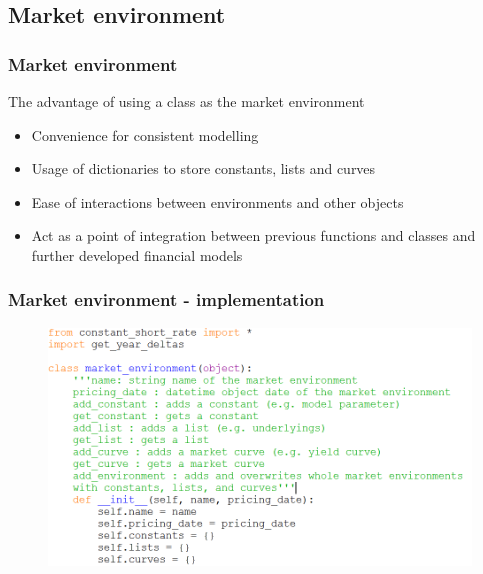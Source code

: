 \documentclass{beamer}
\begin{document}
\subsection{Market environment}
\begin{frame}
\frametitle{Market environment}
The advantage of using a class as the market environment\\[2mm]
\begin{itemize}
	\item Convenience for consistent modelling
	\item Usage of dictionaries to store constants, lists and curves
	\item Ease of interactions between environments and other objects
	\item Act as a point of integration between previous functions and classes and further developed financial models
\end{itemize}
\end{frame}

\begin{frame}
\frametitle{Market environment - implementation}
\begin{figure}[H]
	\includegraphics[scale=0.5]{market_environment_1.png}
\end{figure}
\end{frame}
\end{document}
